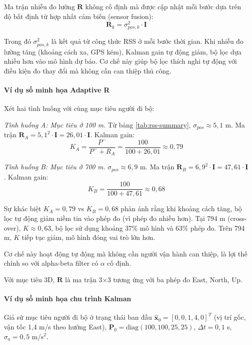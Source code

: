 \hspace{0.5cm} Ma trận nhiễu đo lường $\mathbf{R}$ không cố định mà được cập nhật mỗi bước dựa trên độ bất định từ hợp nhất cảm biến (sensor fusion):
\begin{equation}
    \mathbf{R}_k = \sigma_{pos,k}^2 \cdot \mathbf{I}
\end{equation}

Trong đó $\sigma_{pos,k}^2$ là kết quả từ công thức RSS ở mỗi bước thời gian. Khi nhiễu đo lường tăng (khoảng cách xa, GPS kém), Kalman gain tự động giảm, bộ lọc dựa nhiều hơn vào mô hình dự báo. Cơ chế này giúp bộ lọc thích nghi tự động với điều kiện đo thay đổi mà không cần can thiệp thủ công.

\paragraph{Ví dụ số minh họa Adaptive R\\} Xét hai tình huống với cùng mục tiêu người đi bộ:

\textit{Tình huống A: Mục tiêu ở 100 m.} Từ bảng \ref{tab:rss-summary}, $\sigma_{pos} \approx 5{,}1$ m. Ma trận $\mathbf{R}_A = 5{,}1^2 \cdot \mathbf{I} = 26{,}01 \cdot \mathbf{I}$. Kalman gain:
\begin{equation}
    K_A = \frac{P^-}{P^- + R_A} = \frac{100}{100 + 26{,}01} \approx 0{,}79
\end{equation}

\textit{Tình huống B: Mục tiêu ở 700 m.} $\sigma_{pos} \approx 6{,}9$ m. Ma trận $\mathbf{R}_B = 6{,}9^2 \cdot \mathbf{I} = 47{,}61 \cdot \mathbf{I}$. Kalman gain:
\begin{equation}
    K_B = \frac{100}{100 + 47{,}61} \approx 0{,}68
\end{equation}

Sự khác biệt $K_A = 0{,}79$ vs $K_B = 0{,}68$ phản ánh rằng khi khoảng cách tăng, bộ lọc tự động giảm niềm tin vào phép đo (vì phép đo nhiễu hơn). Tại 794 m (cross-over), $K \approx 0{,}63$, bộ lọc sử dụng khoảng 37\% mô hình và 63\% phép đo. Trên 794 m, $K$ tiếp tục giảm, mô hình đóng vai trò lớn hơn.

Cơ chế này hoạt động tự động mà không cần người vận hành can thiệp, là lợi thế chính so với alpha-beta filter có $\alpha$ cố định.

Với mục tiêu 3D, $\mathbf{R}$ là ma trận 3×3 tương ứng với ba phép đo East, North, Up.

\paragraph{Ví dụ số minh họa chu trình Kalman\\} Giả sử mục tiêu người đi bộ ở trạng thái ban đầu $\hat{\mathbf{x}}_0 = [0, 0, 1{,}4, 0]^T$ (vị trí gốc, vận tốc 1,4 m/s theo hướng East), $\mathbf{P}_0 = \text{diag}(100, 100, 25, 25)$, $\Delta t = 0{,}1$ s, $\sigma_a = 0{,}5$ m/s$^2$.

